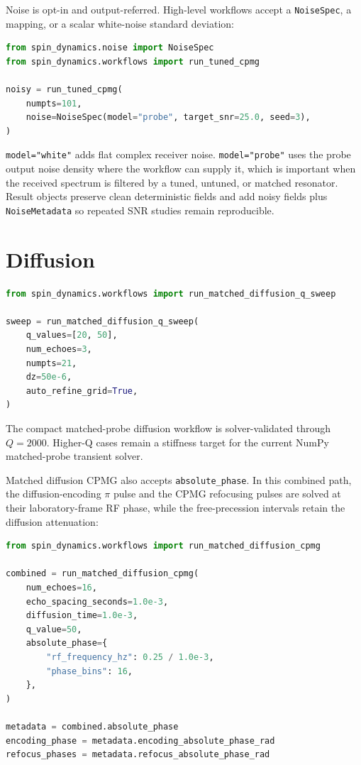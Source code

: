 \documentclass[11pt,oneside]{report}
\newcommand{\code}[1]{\texttt{#1}}
\begin{document}
Noise is opt-in and output-referred. High-level workflows accept a
\code{NoiseSpec}, a mapping, or a scalar white-noise standard deviation:

\begin{lstlisting}[language=Python]
from spin_dynamics.noise import NoiseSpec
from spin_dynamics.workflows import run_tuned_cpmg

noisy = run_tuned_cpmg(
    numpts=101,
    noise=NoiseSpec(model="probe", target_snr=25.0, seed=3),
)
\end{lstlisting}

\code{model="white"} adds flat complex receiver noise. \code{model="probe"}
uses the probe output noise density where the workflow can supply it, which is
important when the received spectrum is filtered by a tuned, untuned, or
matched resonator. Result objects preserve clean deterministic fields and add
noisy fields plus \code{NoiseMetadata} so repeated SNR studies remain
reproducible.

\section{Diffusion}

\begin{lstlisting}[language=Python]
from spin_dynamics.workflows import run_matched_diffusion_q_sweep

sweep = run_matched_diffusion_q_sweep(
    q_values=[20, 50],
    num_echoes=3,
    numpts=21,
    dz=50e-6,
    auto_refine_grid=True,
)
\end{lstlisting}

The compact matched-probe diffusion workflow is solver-validated through
\(Q=2000\). Higher-Q cases remain a stiffness target for the current NumPy
matched-probe transient solver.

Matched diffusion CPMG also accepts \code{absolute\_phase}.  In this combined
path, the diffusion-encoding \(\pi\) pulse and the CPMG refocusing pulses are
solved at their laboratory-frame RF phase, while the free-precession intervals
retain the diffusion attenuation:

\begin{lstlisting}[language=Python]
from spin_dynamics.workflows import run_matched_diffusion_cpmg

combined = run_matched_diffusion_cpmg(
    num_echoes=16,
    echo_spacing_seconds=1.0e-3,
    diffusion_time=1.0e-3,
    q_value=50,
    absolute_phase={
        "rf_frequency_hz": 0.25 / 1.0e-3,
        "phase_bins": 16,
    },
)

metadata = combined.absolute_phase
encoding_phase = metadata.encoding_absolute_phase_rad
refocus_phases = metadata.refocus_absolute_phase_rad
\end{lstlisting}
\end{document}
